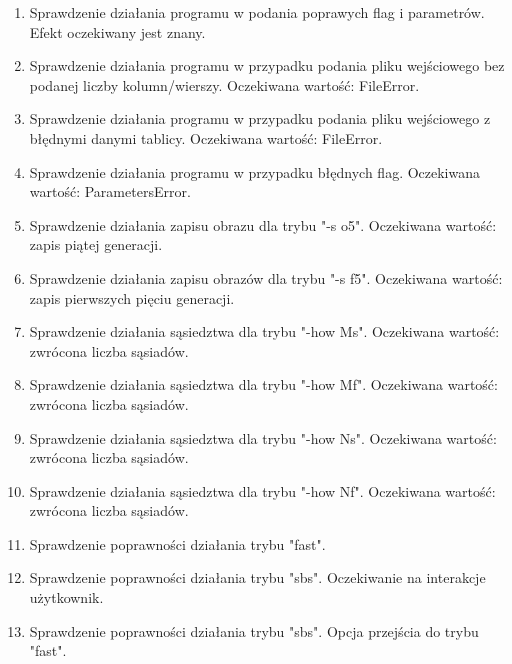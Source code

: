 \documentclass[a4paper]{article}
\begin{document}
\begin{enumerate}
	\item Sprawdzenie dzia\l{}ania programu w podania poprawych flag i parametr\'ow. Efekt oczekiwany jest znany.
	\item Sprawdzenie dzia\l{}ania programu w przypadku podania pliku wej\'sciowego bez podanej liczby kolumn/wierszy. Oczekiwana warto\'s\'c: FileError.
	\item Sprawdzenie dzia\l{}ania programu w przypadku podania pliku wej\'sciowego z b\l{}\k{e}dnymi danymi tablicy. Oczekiwana warto\'s\'c: FileError.
	\item Sprawdzenie dzia\l{}ania programu w przypadku b\l{}\k{e}dnych flag. Oczekiwana warto\'s\'c: ParametersError.
	\item Sprawdzenie dzia\l{}ania zapisu obrazu dla trybu "-s o5". Oczekiwana warto\'s\'c: zapis pi\k{a}tej generacji.
	\item Sprawdzenie dzia\l{}ania zapisu obraz\'ow dla trybu "-s f5". Oczekiwana warto\'s\'c: zapis pierwszych pi\k{e}ciu generacji.
	\item Sprawdzenie dzia\l{}ania s\k{a}siedztwa dla trybu "-how Ms". Oczekiwana warto\'s\'c: zwr\'ocona liczba s\k{a}siad\'ow.
	\item Sprawdzenie dzia\l{}ania s\k{a}siedztwa dla trybu "-how Mf". Oczekiwana warto\'s\'c: zwr\'ocona liczba s\k{a}siad\'ow.
	\item Sprawdzenie dzia\l{}ania s\k{a}siedztwa dla trybu "-how Ns". Oczekiwana warto\'s\'c: zwr\'ocona liczba s\k{a}siad\'ow.
	\item Sprawdzenie dzia\l{}ania s\k{a}siedztwa dla trybu "-how Nf". Oczekiwana warto\'s\'c: zwr\'ocona liczba s\k{a}siad\'ow.
	\item Sprawdzenie poprawno\'sci dzia\l{}ania trybu "fast".
	\item Sprawdzenie poprawno\'sci dzia\l{}ania trybu "sbs". Oczekiwanie na interakcje u\.zytkownik.
	\item Sprawdzenie poprawno\'sci dzia\l{}ania trybu "sbs". Opcja przej\'scia do trybu "fast".

\end{enumerate}
\end{document}
